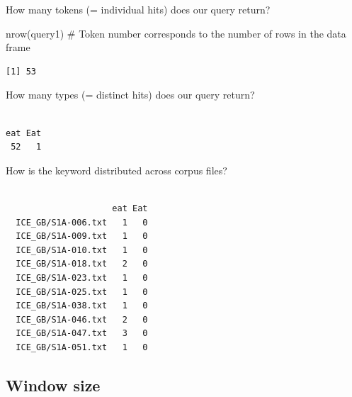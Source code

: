 \documentclass[
  11pt,
  letterpaper,
  DIV=11,
  numbers=noendperiod]{scrreprt}
\newenvironment{Shaded}{\begin{snugshade}}{\end{snugshade}}
\newcommand{\AttributeTok}[1]{\textcolor[rgb]{0.40,0.45,0.13}{#1}}
\newcommand{\CommentTok}[1]{\textcolor[rgb]{0.37,0.37,0.37}{#1}}
\newcommand{\DecValTok}[1]{\textcolor[rgb]{0.68,0.00,0.00}{#1}}
\newcommand{\FunctionTok}[1]{\textcolor[rgb]{0.28,0.35,0.67}{#1}}
\newcommand{\NormalTok}[1]{\textcolor[rgb]{0.00,0.23,0.31}{#1}}
\newcommand{\OtherTok}[1]{\textcolor[rgb]{0.00,0.23,0.31}{#1}}
\newcommand{\SpecialCharTok}[1]{\textcolor[rgb]{0.37,0.37,0.37}{#1}}
\begin{document}
How many tokens (= individual hits) does our query return?

\begin{Shaded}
\begin{Highlighting}[]
\FunctionTok{nrow}\NormalTok{(query1) }\CommentTok{\# Token number corresponds to the number of rows in the data frame}
\end{Highlighting}
\end{Shaded}

\begin{verbatim}
[1] 53
\end{verbatim}

How many types (= distinct hits) does our query return?

\begin{Shaded}
\end{Shaded}

\begin{verbatim}

eat Eat 
 52   1 
\end{verbatim}

How is the keyword distributed across corpus files?

\begin{Shaded}
\end{Shaded}

\begin{verbatim}
                    
                     eat Eat
  ICE_GB/S1A-006.txt   1   0
  ICE_GB/S1A-009.txt   1   0
  ICE_GB/S1A-010.txt   1   0
  ICE_GB/S1A-018.txt   2   0
  ICE_GB/S1A-023.txt   1   0
  ICE_GB/S1A-025.txt   1   0
  ICE_GB/S1A-038.txt   1   0
  ICE_GB/S1A-046.txt   2   0
  ICE_GB/S1A-047.txt   3   0
  ICE_GB/S1A-051.txt   1   0
\end{verbatim}

\subsection{Window size}\label{window-size}
\end{document}
